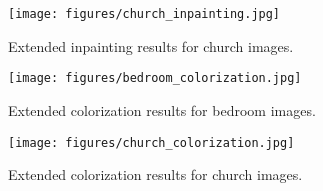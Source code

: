 \documentclass{article} \usepackage{iclr2021_conference,times}
\begin{document}
\begin{figure}
    \centering
    \texttt{[image: figures/church\_inpainting.jpg]}
    \caption{Extended inpainting results for  church images.}
    \label{fig:church_inpainting}
\end{figure}

\begin{figure}
    \centering
    \texttt{[image: figures/bedroom\_colorization.jpg]}
    \caption{Extended colorization results for  bedroom images.}
    \label{fig:bedroom_colorization}
\end{figure}

\begin{figure}
    \centering
    \texttt{[image: figures/church\_colorization.jpg]}
    \caption{Extended colorization results for  church images.}
    \label{fig:church_colorization}
\end{figure}
 
\end{document}
